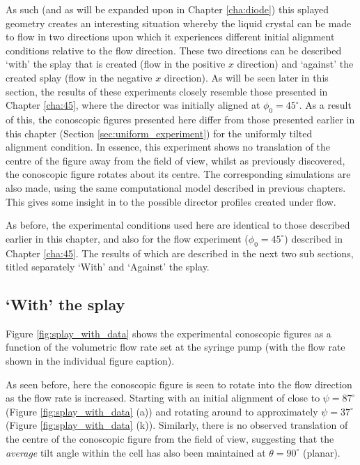 As such (and as will be expanded upon in Chapter \ref{cha:diode}) this splayed geometry creates an interesting situation whereby the liquid crystal can be made to flow in two directions upon which it experiences different initial alignment conditions relative to the flow direction. These two directions can be described `with' the splay that is created (flow in the positive $x$ direction) and `against' the created splay (flow in the negative $x$ direction). As will be seen later in this section, the results of these experiments closely resemble those presented in Chapter \ref{cha:45}, where the director was initially aligned at $\phi_0=45^{\circ}$. As a result of this, the conoscopic figures presented here differ from those presented earlier in this chapter (Section \ref{sec:uniform_experiment}) for the uniformly tilted alignment condition. In essence, this experiment shows no translation of the centre of the figure away from the field of view, whilst as previously discovered, the conoscopic figure rotates about its centre. The corresponding simulations are also made, using the same computational model described in previous chapters. This gives some insight in to the possible director profiles created under flow.

As before, the experimental conditions used here are identical to those described earlier in this chapter, and also for the flow experiment ($\phi_0=45^{\circ}$) described in Chapter \ref{cha:45}. The results of which are described in the next two sub sections, titled separately `With' and `Against' the splay.

\subsection{`With' the splay}
Figure \ref{fig:splay_with_data} shows the experimental conoscopic figures as a function of the volumetric flow rate set at the syringe pump (with the flow rate shown in the individual figure caption).

As seen before, here the conoscopic figure is seen to rotate into the flow direction as the flow rate is increased. Starting with an initial alignment of close to $\psi=87^{\circ}$ (Figure \ref{fig:splay_with_data} (a)) and rotating around to approximately $\psi=37^{\circ}$ (Figure \ref{fig:splay_with_data} (k)). Similarly, there is no observed translation of the centre of the conoscopic figure from the field of view, suggesting that the \textit{average} tilt angle within the cell has also been maintained at $\theta=90^{\circ}$ (planar). 


